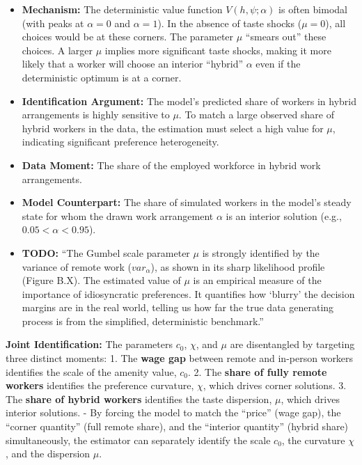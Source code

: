 \documentclass[
  11pt,
  letterpaper,
  DIV=11,
  numbers=noendperiod]{scrartcl}
\providecommand{\tightlist}{%
  \setlength{\itemsep}{0pt}\setlength{\parskip}{0pt}}\usepackage{longtable,booktabs,array}
\begin{document}
\begin{itemize}
  \begin{itemize}
  \tightlist
  \item
    \textbf{Mechanism:} The deterministic value function
    \(V(h, \psi; \alpha)\) is often bimodal (with peaks at
    \(\alpha = 0\) and \(\alpha = 1\)). In the absence of taste shocks
    (\(\mu=0\)), all choices would be at these corners. The parameter
    \(\mu\) ``smears out'' these choices. A larger \(\mu\) implies more
    significant taste shocks, making it more likely that a worker will
    choose an interior ``hybrid'' \(\alpha\) even if the deterministic
    optimum is at a corner.
  \item
    \textbf{Identification Argument:} The model's predicted share of
    workers in hybrid arrangements is highly sensitive to \(\mu\). To
    match a large observed share of hybrid workers in the data, the
    estimation must select a high value for \(\mu\), indicating
    significant preference heterogeneity.
  \item
    \textbf{Data Moment:} The share of the employed workforce in hybrid
    work arrangements.
  \item
    \textbf{Model Counterpart:} The share of simulated workers in the
    model's steady state for whom the drawn work arrangement \(\alpha\)
    is an interior solution (e.g., \(0.05 < \alpha < 0.95\)).
  \item
    \textbf{TODO:} ``The Gumbel scale parameter \(\mu\) is strongly
    identified by the variance of remote work (\(var_\alpha\)), as shown
    in its sharp likelihood profile (Figure B.X). The estimated value of
    \(\mu\) is an empirical measure of the importance of idiosyncratic
    preferences. It quantifies how `blurry' the decision margins are in
    the real world, telling us how far the true data generating process
    is from the simplified, deterministic benchmark.''
  \end{itemize}
\end{itemize}

\textbf{Joint Identification:} The parameters \(c_{0}\), \(\chi\), and
\(\mu\) are disentangled by targeting three distinct moments: 1. The
\textbf{wage gap} between remote and in-person workers identifies the
scale of the amenity value, \(c_{0}\). 2. The \textbf{share of fully
remote workers} identifies the preference curvature, \(\chi\), which
drives corner solutions. 3. The \textbf{share of hybrid workers}
identifies the taste dispersion, \(\mu\), which drives interior
solutions. - By forcing the model to match the ``price'' (wage gap), the
``corner quantity'' (full remote share), and the ``interior quantity''
(hybrid share) simultaneously, the estimator can separately identify the
scale \(c_{0}\), the curvature \(\chi\), and the dispersion \(\mu\).
\end{document}
